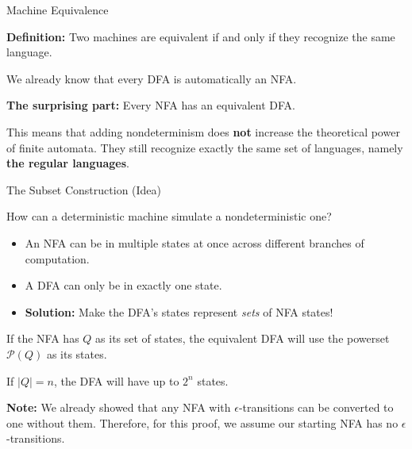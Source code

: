 \documentclass[10pt,aspectratio=169]{beamer}
\newcommand{\powset}[1]{\mathcal P({#1})}
\begin{document}
\begin{frame}{Machine Equivalence}

\textbf{Definition:} Two machines are equivalent if and only if they recognize the same language.

\vspace{1em}

We already know that every DFA is automatically an NFA. 

\pause
\vspace{1em}

\textbf{The surprising part:} 
Every NFA has an equivalent DFA.

\vspace{1em}

This means that adding nondeterminism does \textbf{not} increase the theoretical power of finite automata. They still recognize exactly the same set of languages, namely \textbf{the regular languages}.

\end{frame}

\begin{frame}{The Subset Construction (Idea)}

How can a deterministic machine simulate a nondeterministic one?

\vspace{1em}

\begin{itemize}
\item An NFA can be in multiple states at once across different branches of computation.
\item A DFA can only be in exactly one state.
\item \textbf{Solution:} Make the DFA's states represent \textit{sets} of NFA states!
\end{itemize}

\vspace{1em}

\pause
If the NFA has $Q$ as its set of states, the equivalent DFA will use the powerset $\powset{Q}$ as its states. 

\vspace{0.5em}

If $|Q| = n$, the DFA will have up to $2^n$ states.

\vspace{1em}
\textbf{Note:} We already showed that any NFA with $\epsilon$-transitions can be converted to one without them. Therefore, for this proof, we assume our starting NFA has no $\epsilon$-transitions.

\end{frame}
\end{document}
